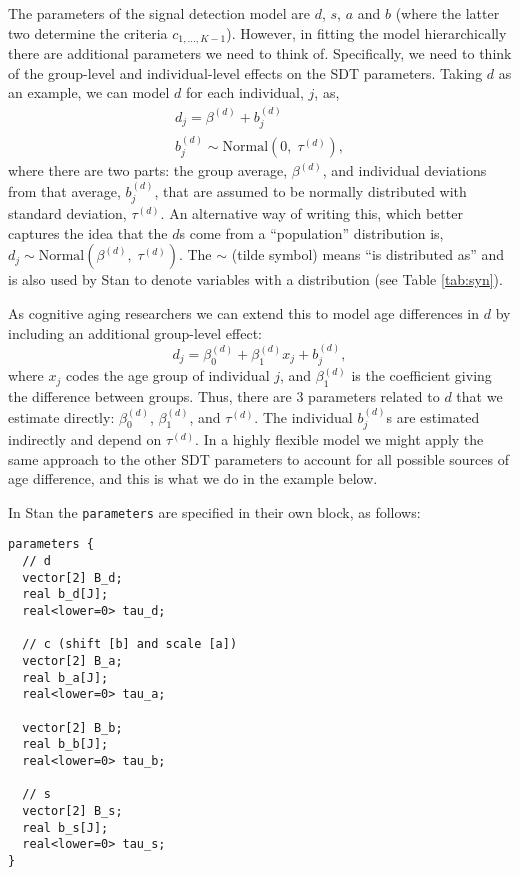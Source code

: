 \documentclass[
  english,
  ,man,floatsintext]{apa6}
\begin{document}
The parameters of the signal detection model are \(d\), \(s\), \(a\) and \(b\) (where the latter two determine the criteria \(c_{1, ..., K-1}\)). However, in fitting the model hierarchically there are additional parameters we need to think of. Specifically, we need to think of the group-level and individual-level effects on the SDT parameters. Taking \(d\) as an example, we can model \(d\) for each individual, \(j\), as,
\[
\begin{aligned}
d_{j} = \beta^{(d)} + b^{(d)}_{j} \\
b^{(d)}_{j} \sim \mbox{Normal}(0, \; \tau^{(d)}),
\end{aligned}
\]
where there are two parts: the group average, \(\beta^{(d)}\), and individual deviations from that average, \(b^{(d)}_{j}\), that are assumed to be normally distributed with standard deviation, \(\tau^{(d)}\). An alternative way of writing this, which better captures the idea that the \(d\)s come from a \enquote{population} distribution is, \(d_j \sim \mbox{Normal}(\beta^{(d)}, \; \tau^{(d)})\). The \(\sim\) (tilde symbol) means \enquote{is distributed as} and is also used by Stan to denote variables with a distribution (see Table \ref{tab:syn}).

As cognitive aging researchers we can extend this to model age differences in \(d\) by including an additional group-level effect:
\[
d_{j} = \beta_{0}^{(d)} + \beta_{1}^{(d)}x_j + b^{(d)}_{j},
\]
where \(x_j\) codes the age group of individual \(j\), and \(\beta_{1}^{(d)}\) is the coefficient giving the difference between groups. Thus, there are 3 parameters related to \(d\) that we estimate directly: \(\beta_{0}^{(d)}\), \(\beta_{1}^{(d)}\), and \(\tau^{(d)}\). The individual \(b^{(d)}_{j}\)s are estimated indirectly and depend on \(\tau^{(d)}\). In a highly flexible model we might apply the same approach to the other SDT parameters to account for all possible sources of age difference, and this is what we do in the example below.

In Stan the \texttt{parameters} are specified in their own block, as follows:

\begin{verbatim}
parameters {
  // d
  vector[2] B_d;
  real b_d[J];
  real<lower=0> tau_d;
  
  // c (shift [b] and scale [a])
  vector[2] B_a;
  real b_a[J];
  real<lower=0> tau_a;
  
  vector[2] B_b;
  real b_b[J];
  real<lower=0> tau_b;

  // s
  vector[2] B_s;
  real b_s[J];
  real<lower=0> tau_s;
}
\end{verbatim}
\end{document}
